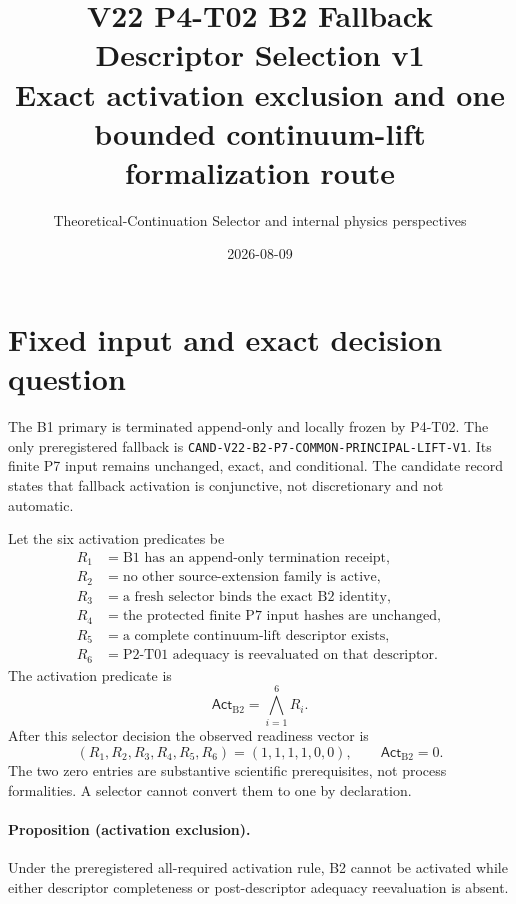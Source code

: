 \documentclass[11pt]{article}
\title{V22 P4-T02 B2 Fallback Descriptor Selection v1\\
\large Exact activation exclusion and one bounded continuum-lift formalization route}
\author{Theoretical-Continuation Selector and internal physics perspectives}
\date{2026-08-09}
\newcommand{\Btwo}{\mathrm{B2}}
\newcommand{\Act}{\mathsf{Act}_{\Btwo}}
\begin{document}
\sloppy
\maketitle

\begin{center}
\end{center}

\section{Fixed input and exact decision question}

The B1 primary is terminated append-only and locally frozen by P4-T02. The
only preregistered fallback is
\texttt{CAND-V22-B2-P7-COMMON-PRINCIPAL-LIFT-V1}. Its finite P7 input remains
unchanged, exact, and conditional. The candidate record states that fallback
activation is conjunctive, not discretionary and not automatic.

Let the six activation predicates be
\begin{align*}
R_1&=\text{B1 has an append-only termination receipt},\\
R_2&=\text{no other source-extension family is active},\\
R_3&=\text{a fresh selector binds the exact B2 identity},\\
R_4&=\text{the protected finite P7 input hashes are unchanged},\\
R_5&=\text{a complete continuum-lift descriptor exists},\\
R_6&=\text{P2-T01 adequacy is reevaluated on that descriptor}.
\end{align*}
The activation predicate is
\[
  \Act=\bigwedge_{i=1}^{6}R_i.
\]
After this selector decision the observed readiness vector is
\[
  (R_1,R_2,R_3,R_4,R_5,R_6)=(1,1,1,1,0,0),
  \qquad \Act=0.
\]
The two zero entries are substantive scientific prerequisites, not process
formalities. A selector cannot convert them to one by declaration.

\paragraph{Proposition (activation exclusion).}
Under the preregistered all-required activation rule, B2 cannot be activated
while either descriptor completeness or post-descriptor adequacy reevaluation
is absent.
\end{document}

